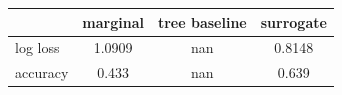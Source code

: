 \begin{tabular}{lccc}
\toprule
 & marginal & tree baseline & surrogate \\
\midrule
log loss & 1.0909 & nan & 0.8148 \\
accuracy & 0.433 & nan & 0.639 \\
\bottomrule
\end{tabular}
